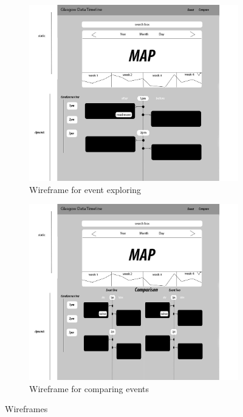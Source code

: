 \documentclass{l4proj}
\begin{document}
\begin{figure}[H]
		\begin{subfigure}{.5\textwidth}
			\centering
			\includegraphics[width=\textwidth]{images/FinalPrototypeEvent}
			\caption{Wireframe for event exploring}
			\label{finalPrototypeEvent}
		\end{subfigure}
		\begin{subfigure}{.5\textwidth}
			\centering
			\includegraphics[width=\textwidth]{images/FinalPrototypeCompare}
			\caption{Wireframe for comparing events}
			\label{finalPrototypeCompare}
		\end{subfigure}
		\caption{Wireframes}
\end{figure}
\end{document}
